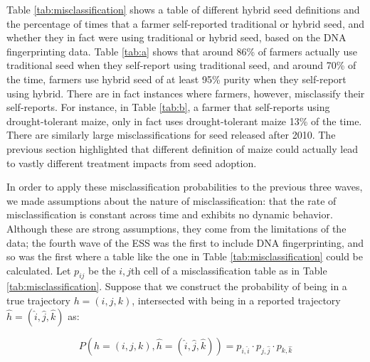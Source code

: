 \documentclass[11pt]{article}
\begin{document}
Table \ref{tab:misclassification} shows a table of different hybrid seed definitions and the percentage of times that a farmer self-reported traditional or hybrid seed, and whether they in fact were using traditional or hybrid seed, based on the DNA fingerprinting data. Table \ref{tab:a} shows that around 86\% of farmers actually use traditional seed when they self-report using traditional seed, and around 70\% of the time, farmers use hybrid seed of at least 95\% purity when they self-report using hybrid. There are in fact instances where farmers, however, misclassify their self-reports. For instance, in Table \ref{tab:b}, a farmer that self-reports using drought-tolerant maize, only in fact uses drought-tolerant maize 13\% of the time. There are similarly large misclassifications for seed released after 2010. The previous section highlighted that different definition of maize could actually lead to vastly different treatment impacts from seed adoption. 

In order to apply these misclassification probabilities to the previous three waves, we made assumptions about the nature of misclassification: that the rate of misclassification is constant across time and exhibits no dynamic behavior. Although these are strong assumptions, they come from the limitations of the data; the fourth wave of the ESS was the first to include DNA fingerprinting, and so was the first where a table like the one in Table \ref{tab:misclassification} could be calculated. Let $p_{ij}$ be the $i,j$th cell of a misclassification table as in Table \ref{tab:misclassification}. Suppose that we construct the probability of being in a true trajectory $h = (i,j,k)$, intersected with being in a reported trajectory $\hat{h} = (\hat{i},\hat{j}, \hat{k})$ as:

\begin{equation}
\label{eq:misclass}
P(h = (i,j,k) , \hat{h} = (\hat{i},\hat{j}, \hat{k})) = p_{i, \hat{i}}\cdot p_{j, \hat{j}}\cdot p_{k, \hat{k}}
\end{equation}
\end{document}
